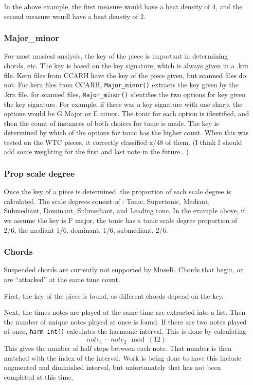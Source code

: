 \documentclass[12pt,twoside]{reedthesis}
\theoremstyle{definition}
\theoremstyle{definition}
\theoremstyle{definition}
\theoremstyle{remark}
\begin{document}
In the above example, the first measure would have a beat density of 4,
and the second measure woudl have a beat density of 2.

\subsubsection{Major\_minor}\label{major_minor}

For most musical analysis, the key of the piece is important in
determining chords, etc. The key is based on the key signature, which is
always given in a .krn file. Kern files from CCARH have the key of the
piece given, but scanned files do not. For kern files from CCARH,
\texttt{Major\_minor()} extracts the key given by the .krn file. for
scanned files, \texttt{Major\_minor()} identifies the two options for
key given the key signature. For example, if there was a key signature
with one sharp, the options would be G Major or E minor. The tonic for
each option is identified, and then the count of instances of both
choices for tonic is made. The key is determined by which of the options
for tonic has the higher count. When this was tested on the WTC pieces,
it correctly classified x/48 of them. (I think I should add some
weighting for the first and last note in the future.. )

\subsubsection{Prop scale degree}\label{prop-scale-degree}

Once the key of a piece is determined, the proportion of each scale
degree is calculated. The scale degrees consist of : Tonic, Supertonic,
Mediant, Submediant, Dominant, Submediant, and Leading tone. In the
example above, if we assume the key is F major, the tonic has a tonic
scale degree proportion of 2/6, the mediant 1/6, dominant, 1/6,
submediant, 2/6.

\subsubsection{Chords}\label{chords}

Suspended chords are currently not supported by MuseR. Chords that
begin, or are ``attacked'' at the same time count.

First, the key of the piece is found, as different chords depend on the
key.

Next, the times notes are played at the same time are extracted into a
list. Then the number of unique notes played at once is found. If there
are two notes played at once, \texttt{harm\_int()} calculates the
harmonic interval. This is done by calculating
\[note_1 - note_2 \mod(12)\] This gives the number of half steps between
each note. That number is then matched with the index of the interval.
Work is being done to have this include augmented and diminished
interval, but unfortunately that has not been completed at this time.
\end{document}
